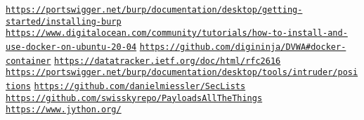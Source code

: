 \documentclass[twocolumn]{article}
\begin{document}
\begin{thebibliography}{9}

    \texttt{\url{https://portswigger.net/burp/documentation/desktop/getting-started/installing-burp}}
    \texttt{\url{https://www.digitalocean.com/community/tutorials/how-to-install-and-use-docker-on-ubuntu-20-04}}
    \texttt{\url{https://github.com/digininja/DVWA#docker-container}}
    \texttt{\url{https://datatracker.ietf.org/doc/html/rfc2616}}
    \texttt{\url{https://portswigger.net/burp/documentation/desktop/tools/intruder/positions}}
    \texttt{\url{https://github.com/danielmiessler/SecLists}}
    \texttt{\url{https://github.com/swisskyrepo/PayloadsAllTheThings}}
    \texttt{\url{https://www.jython.org/}}

\end{thebibliography}
\end{document}
